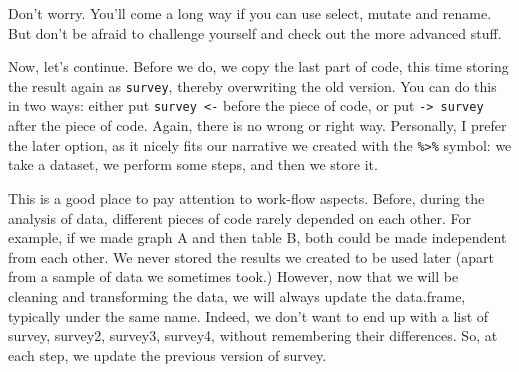 \documentclass[]{tufte-book}
\newenvironment{Shaded}{}{}
\newcommand{\KeywordTok}[1]{\textcolor[rgb]{0.00,0.44,0.13}{\textbf{#1}}}
\newcommand{\DataTypeTok}[1]{\textcolor[rgb]{0.56,0.13,0.00}{#1}}
\newcommand{\StringTok}[1]{\textcolor[rgb]{0.25,0.44,0.63}{#1}}
\newcommand{\OperatorTok}[1]{\textcolor[rgb]{0.40,0.40,0.40}{#1}}
\newcommand{\NormalTok}[1]{#1}
\begin{document}
Don't worry. You'll come a long way if you can use select, mutate and
rename. But don't be afraid to challenge yourself and check out the more
advanced stuff.

Now, let's continue. Before we do, we copy the last part of code, this
time storing the result again as \texttt{survey}, thereby overwriting
the old version. You can do this in two ways: either put
\texttt{survey\ \textless{}-} before the piece of code, or put
\texttt{-\textgreater{}\ survey} after the piece of code. Again, there
is no wrong or right way. Personally, I prefer the later option, as it
nicely fits our narrative we created with the
\texttt{\%\textgreater{}\%} symbol: we take a dataset, we perform some
steps, and then we store it.

\begin{Shaded}
\end{Shaded}

This is a good place to pay attention to work-flow aspects. Before,
during the analysis of data, different pieces of code rarely depended on
each other. For example, if we made graph A and then table B, both could
be made independent from each other. We never stored the results we
created to be used later (apart from a sample of data we sometimes
took.) However, now that we will be cleaning and transforming the data,
we will always update the data.frame, typically under the same name.
Indeed, we don't want to end up with a list of survey, survey2, survey3,
survey4, without remembering their differences. So, at each step, we
update the previous version of survey.
\end{document}
